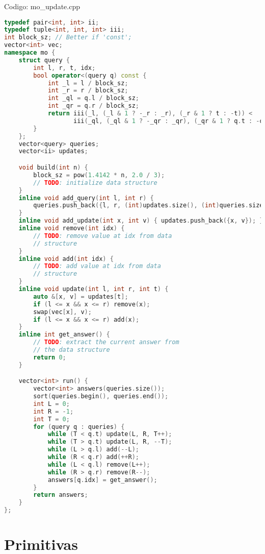 \documentclass[10pt, a4paper, oneside]{book}
\begin{document}
Codigo: mo\_update.cpp

\begin{lstlisting}[language=C++]
typedef pair<int, int> ii;
typedef tuple<int, int, int> iii;
int block_sz; // Better if 'const';
vector<int> vec;
namespace mo {
    struct query {
        int l, r, t, idx;
        bool operator<(query q) const {
            int _l = l / block_sz;
            int _r = r / block_sz;
            int _ql = q.l / block_sz;
            int _qr = q.r / block_sz;
            return iii(_l, (_l & 1 ? -_r : _r), (_r & 1 ? t : -t)) <
                   iii(_ql, (_ql & 1 ? -_qr : _qr), (_qr & 1 ? q.t : -q.t));
        }
    };
    vector<query> queries;
    vector<ii> updates;

    void build(int n) {
        block_sz = pow(1.4142 * n, 2.0 / 3);
        // TODO: initialize data structure
    }
    inline void add_query(int l, int r) {
        queries.push_back({l, r, (int)updates.size(), (int)queries.size()});
    }
    inline void add_update(int x, int v) { updates.push_back({x, v}); }
    inline void remove(int idx) {
        // TODO: remove value at idx from data
        // structure
    }
    inline void add(int idx) {
        // TODO: add value at idx from data
        // structure
    }
    inline void update(int l, int r, int t) {
        auto &[x, v] = updates[t];
        if (l <= x && x <= r) remove(x);
        swap(vec[x], v);
        if (l <= x && x <= r) add(x);
    }
    inline int get_answer() {
        // TODO: extract the current answer from
        // the data structure
        return 0;
    }

    vector<int> run() {
        vector<int> answers(queries.size());
        sort(queries.begin(), queries.end());
        int L = 0;
        int R = -1;
        int T = 0;
        for (query q : queries) {
            while (T < q.t) update(L, R, T++);
            while (T > q.t) update(L, R, --T);
            while (L > q.l) add(--L);
            while (R < q.r) add(++R);
            while (L < q.l) remove(L++);
            while (R > q.r) remove(R--);
            answers[q.idx] = get_answer();
        }
        return answers;
    }
};
\end{lstlisting}
\hfill

\newpage

%
%
%
%

\chapter{Primitivas}
\end{document}
